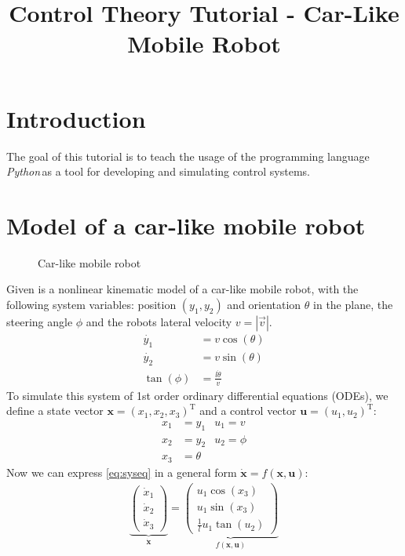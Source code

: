 \documentclass{article}
\title{Control Theory Tutorial - Car-Like Mobile Robot}
\date{}
\author{}
\newcommand{\py}{\emph{Python}\,}
\begin{document}
\maketitle
\section{Introduction}
The goal of this tutorial is to teach the usage of the programming language \py as a tool for developing and simulating control systems.
\section{Model of a car-like mobile robot}
\begin{figure}[ht]
	\centering
	\def\svgwidth{0.7\textwidth}
	
	\caption{Car-like mobile robot}
	\label{fig:car}
\end{figure}
Given is a nonlinear kinematic model of a car-like mobile robot, with the following system variables: position $(y_1, y_2)$ and orientation $\theta$ in the plane, the steering angle $\phi$ and the robots lateral velocity $v=\left| \vec{v} \right| $. 
\begin{subequations}\label{eq:syseq}
\begin{align}
\dot{y_1}&=v \cos (\theta) \\
\dot{y_2}&=v \sin (\theta) \\
\tan(\phi) &= \frac{l\dot{\theta}}{v}
\end{align}
\end{subequations}
To simulate this system of 1st order ordinary differential equations (ODEs), we define a state vector $\mathbf{x}=(x_1,x_2,x_3)^\mathrm{T}$ and a control vector $\mathbf{u}=(u_1,u_2)^\mathrm{T}$:
\begin{align*}
x_1 &= y_1 & u_1 = v\\
x_2 &= y_2 & u_2 = \phi \\
x_3 &= \theta 
\end{align*}
Now we can express \eqref{eq:syseq} in a general form $\dot{\mathbf{x}}=f(\mathbf{x},\mathbf{u})$:
\label{eq:ss_system}
\begin{align}
\underbrace{\begin{pmatrix} \dot{x}_1 \\ \dot{x}_2 \\ \dot{x}_3 \end{pmatrix}}_{\dot{\mathbf{x}}} = \underbrace{\begin{pmatrix}  u_1 \cos(x_3) \\ u_1 \sin(x_3) \\ \frac{1}{l}u_1 \tan(u_2) \end{pmatrix}}_{f(\mathbf{x},\mathbf{u})}
\end{align}
\end{document}

